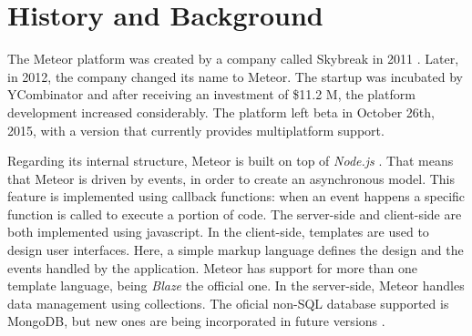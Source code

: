 \section{History and Background}
\label{sec:back}

The Meteor platform was created by a company called Skybreak in 2011 \citep{skybreak}.
Later, in 2012, the company changed its name to Meteor.
The startup was incubated by YCombinator \citep{ycomb} and after receiving an investment of \$11.2 M, the platform development increased considerably.
The platform left beta in October 26th, 2015, with a version that currently provides multiplatform support.

Regarding its internal structure, Meteor is built on top of \emph{Node.js} \citep{node}.
That means that Meteor is driven by events, in order to create an asynchronous model.
This feature is implemented using callback functions: when an event happens a specific function is called to execute a portion of code.
The server-side and client-side are both implemented using javascript.
In the client-side, templates are used to design user interfaces.
Here, a simple markup language defines the design and the events handled by the application.
Meteor has support for more than one template language, being \emph{Blaze} \citep{meteor} the official one.
In the server-side, Meteor handles data management using collections.
The oficial non-SQL database supported is MongoDB, but new ones are being incorporated in future versions \citep{fathom}.